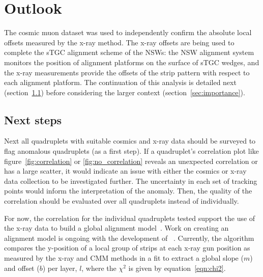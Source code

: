 
\chapter{Outlook}
\label{chap:outlook}

The cosmic muon dataset was used to independently confirm the absolute local offsets measured by the x-ray method. The x-ray offsets are being used to complete the sTGC alignment scheme of the NSWs: the NSW alignment system monitors the position of alignment platforms on the surface of sTGC wedges, and the x-ray measurements provide the offsets of the strip pattern with respect to each alignment platform. The continuation of this analysis is detailed next (section~\ref{sec:next}) before considering the larger context (section~\ref{sec:importance}). 

\section{Next steps}
\label{sec:next}

Next all quadruplets with suitable cosmics and x-ray data should be surveyed to flag anomalous quadruplets (as a first step). If a quadruplet's correlation plot like figure~\ref{fig:correlation} or \ref{fig:no_correlation} reveals an unexpected correlation or has a large scatter, it would indicate an issue with either the cosmics or x-ray data collection to be investigated further. The uncertainty in each set of tracking points would inform the interpretation of the anomaly. Then, the quality of the correlation should be evaluated over all quadruplets instead of individually. 
 
For now, the correlation for the individual quadruplets tested support the use of the x-ray data to build a global alignment model~\cite{lefebvre_precision_2020}. Work on creating an alignment model is ongoing with the development of ~\cite{lefebvre_stgc_as_built_fit}. Currently, the algorithm compares the y-position of a local group of strips at each x-ray gun position as measured by the x-ray and CMM methods in a fit to extract a global slope ($m$) and offset ($b$) per layer, $l$, where the $\chi^2$ is given by equation~\ref{eqn:chi2}.

